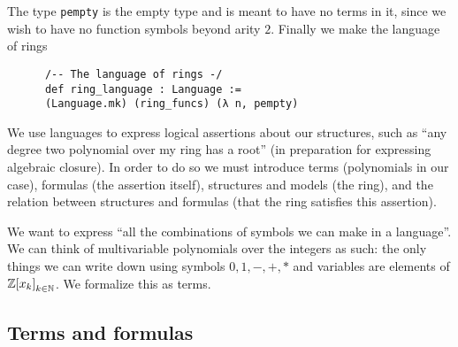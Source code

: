 \begin{dfn}
    The type \texttt{pempty} is the empty type and is meant to have no terms in it,
    since we wish to have no function symbols beyond arity $2$.
    Finally we make the language of rings

    \begin{lstlisting}
      /-- The language of rings -/
      def ring_language : Language :=
      (Language.mk) (ring_funcs) (λ n, pempty)\end{lstlisting}

\end{dfn}

We use languages to express logical assertions about our structures, such as
``any degree two polynomial over my ring has a root''
(in preparation for expressing algebraic closure).
In order to do so we must introduce terms (polynomials in our case),
formulas (the assertion itself), structures and models (the ring),
and the relation between structures and formulas
(that the ring satisfies this assertion).

We want to express ``all the combinations of symbols we can make in a language''.
We can think of multivariable polynomials over the integers as such:
the only things we can write down using symbols $0,1,-,+,*$ and variables
are elements of $\mathbb{Z}{[x_{k}]}_{k \in \mathbb{N}}$.
We formalize this as terms.

\subsection{Terms and formulas}

